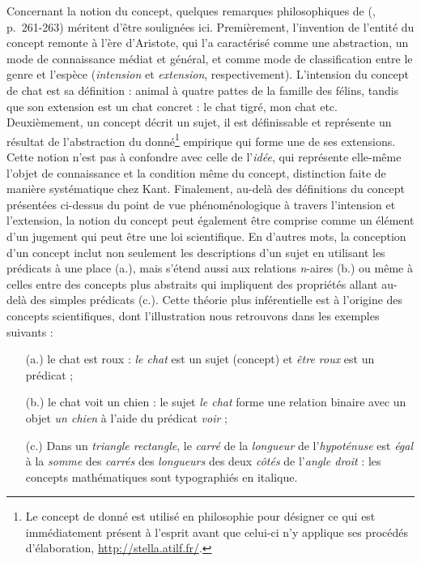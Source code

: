 Concernant la notion du concept, quelques remarques philosophiques de \citeauthor{Lecourt1999} (\citeyear{Lecourt1999}, p.~261-263) méritent d'être soulignées ici. Premièrement, l'invention de l'entité du concept remonte à l'ère d'Aristote, qui l'a caractérisé comme une abstraction, un mode de connaissance médiat et général, et comme mode de classification entre le genre et l'espèce (\textit{intension} et \textit{extension}, respectivement). L'intension du concept de chat est sa définition : \og{}animal à quatre pattes de la famille des félins\fg{}, tandis que son extension est un chat concret : le chat tigré, mon chat etc. Deuxièmement, un concept décrit un sujet, il est définissable et représente un résultat de l'abstraction du donné\footnote{Le concept de \og{}donné\fg{} est utilisé en philosophie pour désigner \og{}ce qui est immédiatement présent à l'esprit avant que celui-ci n'y applique ses procédés d'élaboration\fg{}, \url{http://stella.atilf.fr/}.} empirique qui forme une de ses extensions. Cette notion n'est pas à confondre avec celle de l'\textit{idée}, qui représente elle-même l'objet de connaissance et la condition même du concept, distinction faite de manière systématique chez Kant. Finalement, au-delà des définitions du concept présentées ci-dessus du point de vue phénoménologique à travers l'intension et l'extension, la notion du concept peut également être comprise comme un élément d'un jugement qui peut être une loi scientifique. En d'autres mots, la conception d'un concept inclut non seulement les descriptions d'un sujet en utilisant les prédicats à une place (a.), mais s'étend aussi aux relations \textit{n}-aires (b.) ou même à celles entre des concepts plus abstraits qui impliquent des propriétés allant au-delà des simples prédicats (c.). Cette théorie plus \og{}inférentielle\fg{} est à l'origine des concepts scientifiques, dont l'illustration nous retrouvons dans les exemples suivants :
\begin{itemize}
	\item[\quad (a.)] \og{}le chat est roux\fg{} : \textit{le chat} est un sujet (concept) et \textit{être roux} est un prédicat ;
	\item[\quad (b.)] \og{}le chat voit un chien\fg{} : le sujet \textit{le chat} forme une relation binaire avec un objet \textit{un chien} à l'aide du prédicat \textit{voir} ;
	\item[\quad (c.)] \og{}Dans un \textit{triangle rectangle}, le \textit{carré} de la \textit{longueur} de l'\textit{hypoténuse} est \textit{égal} à la \textit{somme} des \textit{carrés} des \textit{longueurs} des deux \textit{côtés} de l'\textit{angle droit}\fg{} : les concepts mathématiques sont typographiés en italique.
\end{itemize}
\medskip

